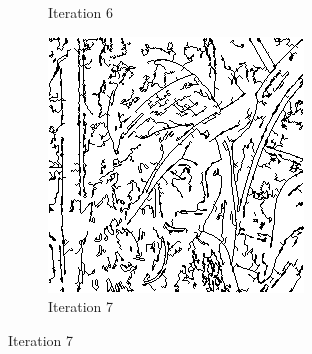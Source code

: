 \documentclass{llncs}
\begin{document}
\begin{figure}
\begin{subfigure}[b]{0.3\textwidth}
                \caption{Iteration 6}
                \label{fig:rand_iter6}
        \end{subfigure}
        \quad
        \begin{subfigure}[b]{0.3\textwidth}
                \includegraphics[width=\textwidth]{IMG/RandomInit/Iteration7}
                \caption{Iteration 7}
                \label{fig:rand_iter7}
        \end{subfigure}
        
        \vspace{5mm}
        

\end{figure}
\end{document}
